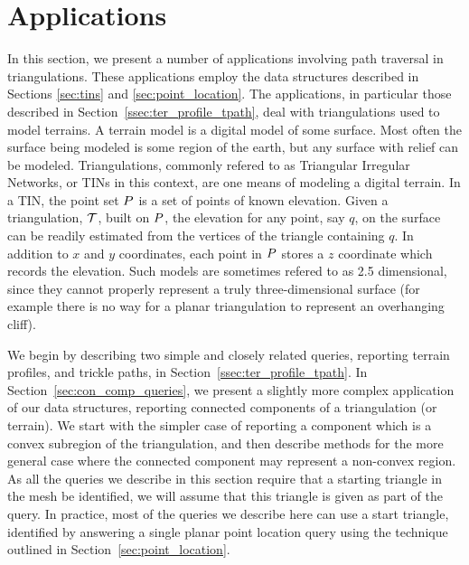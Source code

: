 {  %
  \section{Applications}
  \label{sec:applications}

  In this section, we present a number of applications involving path traversal
  in triangulations.
  These applications employ the data structures described in Sections \ref{sec:tins}
  and \ref{sec:point_location}.
  The applications, in particular those described in 
  Section~\ref{ssec:ter_profile_tpath}, deal with triangulations used to model 
  terrains.
  A terrain model is a digital model of some surface.
  Most often the surface being modeled is some region of the earth, but any surface
  with relief can be modeled.
  Triangulations, commonly refered to as Triangular Irregular Networks, or TINs 
  in this context, are one means of modeling a digital terrain.
  In a TIN, the point set $P$ is a set of points of known elevation. 
  Given a triangulation, $\mathcal{T}$, built on $P$, the elevation for any
  point, say $q$, on the surface can be readily estimated from the vertices
  of the triangle containing $q$.
  In addition to $x$ and $y$ coordinates, each point in $P$ stores a $z$
  coordinate which records the elevation.
  Such models are sometimes refered to as 2.5 dimensional, since they cannot 
  properly represent a truly three-dimensional surface (for example there is no
  way for a planar triangulation to represent an overhanging cliff). 

  We begin by describing two simple and closely related queries, 
  reporting terrain profiles, and trickle paths, in 
  Section~\ref{ssec:ter_profile_tpath}.  
  In Section~\ref{sec:con_comp_queries}, we present a slightly more complex 
  application of our data structures, 
  reporting connected components of a triangulation (or terrain). 
  We start with the simpler case of reporting a component which is a convex
  subregion of the triangulation, and then describe methods for the more 
  general case where the connected component may represent a non-convex region.
  As all the queries we describe in this section require that a starting 
  triangle in the mesh be identified, we will assume that this triangle
  is given as part of the query.
  In practice, most of the queries we describe here can use a start triangle,
  identified by answering a
  single planar point location query using the technique outlined in 
  Section~\ref{sec:point_location}.

}
